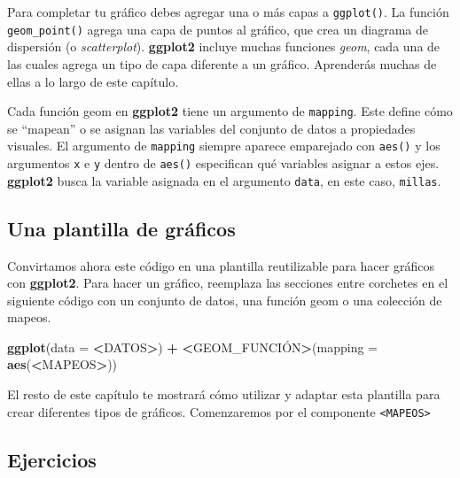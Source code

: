 \documentclass[11pt,oneside]{report}
\newenvironment{Shaded}{\begin{snugshade}}{\end{snugshade}}
\newcommand{\DataTypeTok}[1]{\textcolor[rgb]{0.13,0.29,0.53}{#1}}
\newcommand{\ErrorTok}[1]{\textcolor[rgb]{0.64,0.00,0.00}{\textbf{#1}}}
\newcommand{\KeywordTok}[1]{\textcolor[rgb]{0.13,0.29,0.53}{\textbf{#1}}}
\newcommand{\NormalTok}[1]{#1}
\newcommand{\OperatorTok}[1]{\textcolor[rgb]{0.81,0.36,0.00}{\textbf{#1}}}
\newcommand{\StringTok}[1]{\textcolor[rgb]{0.31,0.60,0.02}{#1}}
\begin{document}
Para completar tu gráfico debes agregar una o más capas a
\texttt{ggplot()}. La función \texttt{geom\_point()} agrega una capa de
puntos al gráfico, que crea un diagrama de dispersión (o
\emph{scatterplot}). \textbf{ggplot2} incluye muchas funciones
\emph{geom}, cada una de las cuales agrega un tipo de capa diferente a
un gráfico. Aprenderás muchas de ellas a lo largo de este capítulo.

Cada función geom en \textbf{ggplot2} tiene un argumento de
\texttt{mapping}. Este define cómo se ``mapean'' o se asignan las
variables del conjunto de datos a propiedades visuales. El argumento de
\texttt{mapping} siempre aparece emparejado con \texttt{aes()} y los
argumentos \texttt{x} e \texttt{y} dentro de \texttt{aes()} especifican
qué variables asignar a estos ejes. \textbf{ggplot2} busca la variable
asignada en el argumento \texttt{data}, en este caso, \texttt{millas}.

\hypertarget{una-plantilla-de-gruxe1ficos}{%
\subsection{Una plantilla de
gráficos}\label{una-plantilla-de-gruxe1ficos}}

Convirtamos ahora este código en una plantilla reutilizable para hacer
gráficos con \textbf{ggplot2}. Para hacer un gráfico, reemplaza las
secciones entre corchetes en el siguiente código con un conjunto de
datos, una función geom o una colección de mapeos.

\begin{Shaded}
\begin{Highlighting}[]
\KeywordTok{ggplot}\NormalTok{(}\DataTypeTok{data =} \OperatorTok{<}\NormalTok{DATOS}\OperatorTok{>}\NormalTok{) }\OperatorTok{+}
\StringTok{  }\ErrorTok{<}\NormalTok{GEOM_FUNCIÓN}\OperatorTok{>}\NormalTok{(}\DataTypeTok{mapping =} \KeywordTok{aes}\NormalTok{(}\OperatorTok{<}\NormalTok{MAPEOS}\OperatorTok{>}\NormalTok{))}
\end{Highlighting}
\end{Shaded}

El resto de este capítulo te mostrará cómo utilizar y adaptar esta
plantilla para crear diferentes tipos de gráficos. Comenzaremos por el
componente \texttt{\textless{}MAPEOS\textgreater{}}

\hypertarget{ejercicios}{%
\subsection{Ejercicios}\label{ejercicios}}
\end{document}
